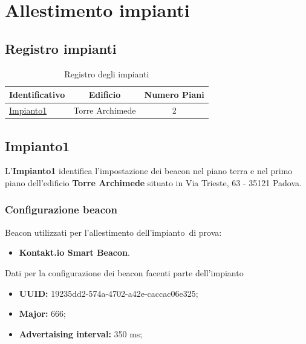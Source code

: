 \documentclass[../SperimentazioniPratiche.tex]{subfiles}
\begin{document}
\section{Allestimento impianti}
\label{sec:AllestimentoImpianto}

	\subsection{Registro impianti}
	
	\begin{table} [h]
		\centering
		\begin{tabular}{lcc}
			\toprule
			\textbf{Identificativo} & \textbf{Edificio} & \textbf{Numero Piani}		\\
			\toprule
			\hyperref[subsec:Impianto1]{Impianto1} & Torre Archimede & 2 \\
			\bottomrule
		\end{tabular}
		\caption{Registro degli impianti}
		\label{tab:RegistroImpianti}
	\end{table}
	
	
	\newpage
	\subsection{Impianto1}
	\label{subsec:Impianto1}
		L'\textbf{Impianto1} identifica l'impostazione dei beacon nel piano terra e nel primo piano dell'edificio \textbf{Torre Archimede} situato in Via Trieste, 63 - 35121 Padova.
		
		\subsubsection{Configurazione beacon}
		Beacon utilizzati per l'allestimento dell'impianto\g\ di prova:
		\begin{itemize}
			\item[] \textbf{Kontakt.io Smart Beacon}.
		\end{itemize}
		Dati per la configurazione dei beacon facenti parte dell'impianto\g\:
		\begin{itemize}
			\item[] \textbf{UUID:} 19235dd2-574a-4702-a42e-caccac06e325;
			\item[] \textbf{Major:} 666;
			\item[] \textbf{Advertaising interval:} 350 ms;
		\end{itemize}
\end{document}
